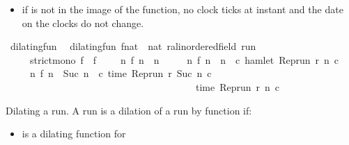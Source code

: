 \begin{isabellebody}
\begin{isamarkuptext}
\begin{itemize}
\item if  is not in the image of the function, no clock ticks at 
instant  and the date on the clocks do not change.%
\end{itemize}%
\end{isamarkuptext}\isamarkuptrue%
\isamarkupfalse%
\ dilating{\isacharunderscore}fun\isanewline
{}\isanewline
\ \ {\isacartoucheopen}dilating{\isacharunderscore}fun\ {\isacharparenleft}f{\isacharcolon}{\isacharcolon}nat\ {\isasymRightarrow}\ nat{\isacharparenright}\ {\isacharparenleft}r{\isacharcolon}{\isacharcolon}{\isacharprime}a{\isacharcolon}{\isacharcolon}linordered{\isacharunderscore}field\ run{\isacharparenright}\isanewline
\ \ \ \ {\isasymequiv}\ strict{\isacharunderscore}mono\ f\ {\isasymand}\ {\isacharparenleft}f\ {}\ {\isacharequal}\ {}{\isacharparenright}\ {\isasymand}\ {\isacharparenleft}{\isasymforall}n{\isachardot}\ f\ n\ {\isasymge}\ n\isanewline
\ \ \ \ {\isasymand}\ {\isacharparenleft}{\isacharparenleft}{\isasymnexists}n\ f\ n\ {\isacharequal}\ n{\isacharparenright}\ {\isasymlongrightarrow}\ {\isacharparenleft}{\isasymforall}c{\isachardot}\ {\isasymnot}{\isacharparenleft}hamlet\ {\isacharparenleft}{\isacharparenleft}Rep{\isacharunderscore}run\ r{\isacharparenright}\ n\ c{\isacharparenright}{\isacharparenright}{\isacharparenright}{\isacharparenright}\isanewline
\ \ \ \ {\isasymand}\ {\isacharparenleft}{\isacharparenleft}{\isasymnexists}n\ f\ n\ {\isacharequal}\ {\isacharparenleft}Suc\ n{\isacharparenright}{\isacharparenright}\ {\isasymlongrightarrow}\ {\isacharparenleft}{\isasymforall}c{\isachardot}\ time\ {\isacharparenleft}{\isacharparenleft}Rep{\isacharunderscore}run\ r{\isacharparenright}\ {\isacharparenleft}Suc\ n{\isacharparenright}\ c{\isacharparenright}\isanewline
\ \ \ \ \ \ \ \ \ \ \ \ \ \ \ \ \ \ \ \ \ \ \ \ \ \ \ \ \ \ \ \ \ \ \ \ \ \ {\isacharequal}\ time\ {\isacharparenleft}{\isacharparenleft}Rep{\isacharunderscore}run\ r{\isacharparenright}\ n\ c{\isacharparenright}{\isacharparenright}{\isacharparenright}\isanewline
\ \ \ {\isacharparenright}{\isacartoucheclose}%
\begin{isamarkuptext}%
Dilating a run. A run  is a dilation of a run  by 
function  if:

%
\begin{itemize}%
\item {} is a dilating function for  


\end{itemize}
\end{isamarkuptext}
\end{isabellebody}
